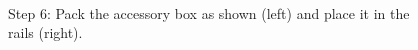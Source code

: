 \begin{figure}[!ht]
\centering
\mbox{\quad
{}}
\caption{Step 6: Pack the accessory box as shown (left) and place it in the rails (right).} %
\end{figure}

